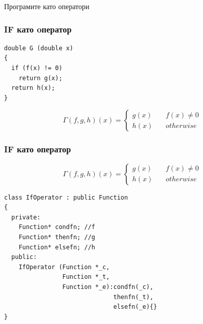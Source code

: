 \documentclass{beamer}
\begin{document}
\begin{frame}
\centerline{Програмите като оператори}
\end{frame}


\begin{frame}[fragile]
\frametitle{IF като oператор}

\begin{center}

\begin{lstlisting}
double G (double x)
{
  if (f(x) != 0)
    return g(x);
  return h(x);
}
\end{lstlisting}

\end{center}


$$
\Gamma(f,g,h)(x) = \left\{
        \begin{array}{ll}
            g(x) & \quad f(x) \neq 0 \\
            h(x) & \quad otherwise
        \end{array}
    \right.
$$



\end{frame}




\begin{frame}[fragile]
\frametitle{IF като оператор}

\begin{center}
$$
\Gamma(f,g,h)(x) = \left\{
        \begin{array}{ll}
            g(x) & \quad f(x) \neq 0 \\
            h(x) & \quad otherwise
        \end{array}
    \right.
$$


\begin{lstlisting}
class IfOperator : public Function
{
  private:
    Function* condfn; //f
    Function* thenfn; //g
    Function* elsefn; //h
  public:
    IfOperator (Function *_c,
                Function *_t,
                Function *_e):condfn(_c),
                              thenfn(_t),
                              elsefn(_e){}
}
\end{lstlisting}

\end{center}


\end{frame}
\end{document}
